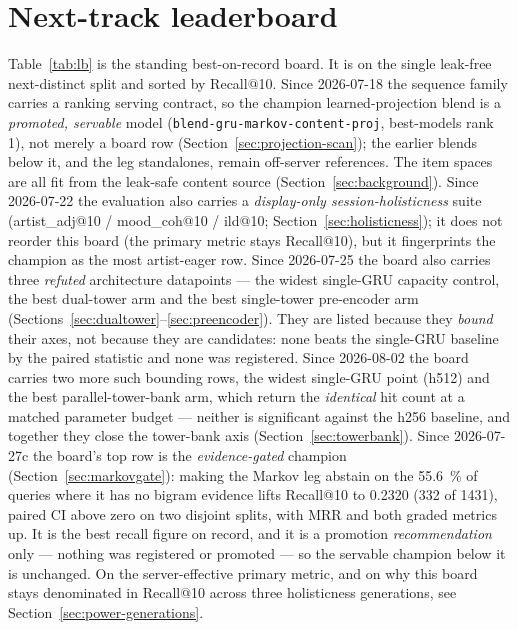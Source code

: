 \documentclass[11pt]{article}
\begin{document}
\section{Next-track leaderboard}
\label{sec:leaderboard}
Table~\ref{tab:lb} is the standing best-on-record board. It is on the single
leak-free next-distinct split and sorted by Recall@10. Since 2026-07-18 the
sequence family carries a ranking serving contract, so the champion
learned-projection blend is a \emph{promoted, servable} model
(\texttt{blend-gru-markov-content-proj}, best-models rank 1), not merely a board
row (Section~\ref{sec:projection-scan}); the earlier blends below it, and the leg
standalones, remain off-server references. The item spaces are all fit from the
leak-safe content source (Section~\ref{sec:background}). Since 2026-07-22 the
evaluation also carries a \emph{display-only session-holisticness} suite
(artist\_adj@10 / mood\_coh@10 / ild@10; Section~\ref{sec:holisticness}); it does
not reorder this board (the primary metric stays Recall@10), but it fingerprints
the champion as the most artist-eager row. Since 2026-07-25 the board also
carries three \emph{refuted} architecture datapoints --- the widest single-GRU
capacity control, the best dual-tower arm and the best single-tower pre-encoder
arm (Sections~\ref{sec:dualtower}--\ref{sec:preencoder}). They are listed
because they \emph{bound} their axes, not because they are candidates: none
beats the single-GRU baseline by the paired statistic and none was registered.
Since 2026-08-02 the board carries two more such bounding rows, the widest
single-GRU point (h512) and the best parallel-tower-bank arm, which return the
\emph{identical} hit count at a matched parameter budget --- neither is
significant against the h256 baseline, and together they close the tower-bank
axis (Section~\ref{sec:towerbank}).
Since 2026-07-27c the board's top row is the \emph{evidence-gated} champion
(Section~\ref{sec:markovgate}): making the Markov leg abstain on the
\SI{55.6}{\percent} of queries where it has no bigram evidence lifts Recall@10 to
\num{0.2320} (\num{332} of \num{1431}), paired CI above zero on two disjoint
splits, with MRR and both graded metrics up. It is the best recall figure on
record, and it is a promotion \emph{recommendation} only --- nothing was registered
or promoted --- so the servable champion below it is unchanged.
On the server-effective primary metric, and on why this board stays denominated
in Recall@10 across three holisticness generations, see
Section~\ref{sec:power-generations}.
\end{document}

